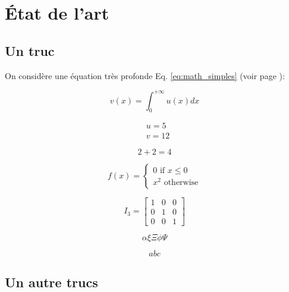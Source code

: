 \documentclass[a4paper, twoside]{article}
\begin{document}
\section{État de l'art}
\subsection{Un truc}

On considère une équation très profonde Eq. \ref{eq:math_simples} (voir page \pageref{eq:math_simples}):

$$ %
v(x) = \int_{0}^{+\infty} u(x) dx 
$$ %

\begin{align}
& u  =   5 \\
& v = 12
\end{align}

\begin{equation}
2+ 2 = 4
\label{eq:math_simples}
\end{equation}

\begin{equation}
f(x) = \left\lbrace 
\begin{split}
0 \mbox{ if } x \leq 0 \\
x^2 \mbox { otherwise}
\end{split}
\right.
\end{equation}


$$
I_3 = 
\begin{bmatrix}
1 & 0 & 0 \\
0 & 1 & 0 \\
0 & 0 & 1 
\end{bmatrix}
$$

$$
\alpha \xi \Xi \phi \Psi
$$

$$
a b c
$$

\subsection{Un autre trucs}


\end{document}
